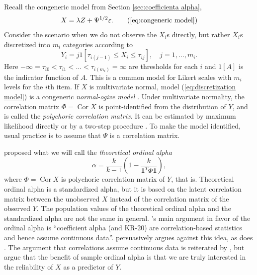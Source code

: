 \documentclass[twoside]{article}
\DeclareMathOperator{\Cor}{Cor}
\begin{document}
Recall the congeneric model from Section \ref{sec:coefficienta alpha},
\begin{equation}
X=\lambda Z+\Psi^{1/2}\varepsilon.    \tag{\ref{eq:congeneric model}}
\end{equation}
Consider the scenario when we do not observe the $X_{i}$s directly,
but rather $X_{i}$s discretized into $m_{i}$ categories according
to
\begin{equation}
Y_{i}=j1[\tau_{i(j-1)}\leq X_{i}\leq\tau_{ij}],\quad j = 1, \ldots,m_i. \label{eq:discretization model}
\end{equation}
Here $-\infty=\tau_{i0}<\tau_{i1}<\ldots<\tau_{i(m_{i})}=\infty$
are thresholds for each $i$ and $1[A]$ is the indicator function of $A$.
This is a common model for Likert scales with $m_{i}$ levels for
the $i$th item. If $X$ is multivariate normal, model (\ref{eq:discretization model})
is a congeneric \textit{normal-ogive model} \citep{Swaminathan2016-rg}.
Under multivariate normality, the correlation matrix $\Phi=\Cor X$ is point-identified
from the distribution of $Y$, and is called the \textit{polychoric
correlation matrix}. It can be estimated by maximum likelihood directly
or by a two-step procedure \citep{Olsson1979-ti}. To make the model
identified, usual practice is to assume that $\Psi$ is a correlation matrix.

\citet{Zumbo2007-ap} proposed what we will call the \textit{theoretical ordinal
alpha}
\begin{equation}
\alpha=\frac{k}{k-1}\left(1-\frac{k}{\boldsymbol{1}^{T}\Phi\boldsymbol{1}}\right), \label{eq:ordinal alpha}
\end{equation}
where $\Phi=\Cor X$ is polychoric correlation matrix of $Y$, that is.
Theoretical ordinal alpha is a standardized alpha, but it is based
on the latent correlation matrix between the unobserved $X$ instead
of the correlation matrix of the observed $Y$. The population
values of the theoretical ordinal alpha and the standardized alpha
are not the same in general. \citet[p. 27]{Zumbo2007-ap}'s main argument
in favor of the ordinal alpha is \enquote{coefficient alpha (and KR-20)
are correlation-based statistics and hence assume continuous data}. \citet[p. 1060]{Chalmers2018-fj}
persuasively argues against this idea, as does \citet{Raykov2019-yr}. The argument that correlations assume continuous data is reiterated
by \citet{Gadermann2012-jl}, but \citet{Zumbo2019-lm} argue
that the benefit of sample ordinal alpha is that we are truly interested
in the reliability of $X$ as a predictor of $Y$.
 
\end{document}
